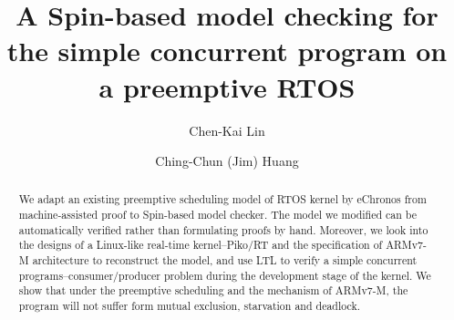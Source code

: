 \documentclass[sigconf]{acmart}
\begin{document}
\title{A Spin-based model checking for the simple concurrent program on a preemptive RTOS}


\author{Chen-Kai Lin}

\author{Ching-Chun (Jim) Huang}

\renewcommand{\shortauthors}{C.K. Lin and Jim Huang}


\begin{abstract}
We adapt an existing preemptive scheduling model of RTOS kernel by eChronos from machine-assisted proof to Spin-based model checker. The model we modified can be automatically verified rather than formulating proofs by hand. Moreover, we look into the designs of a Linux-like real-time kernel--Piko/RT and the specification of ARMv7-M architecture to reconstruct the model, and use LTL to verify a simple concurrent programs--consumer/producer problem during the development stage of the kernel. We show that under the preemptive scheduling and the mechanism of ARMv7-M, the program will not suffer form mutual exclusion, starvation and deadlock.
\end{abstract}



\maketitle





\end{document}
